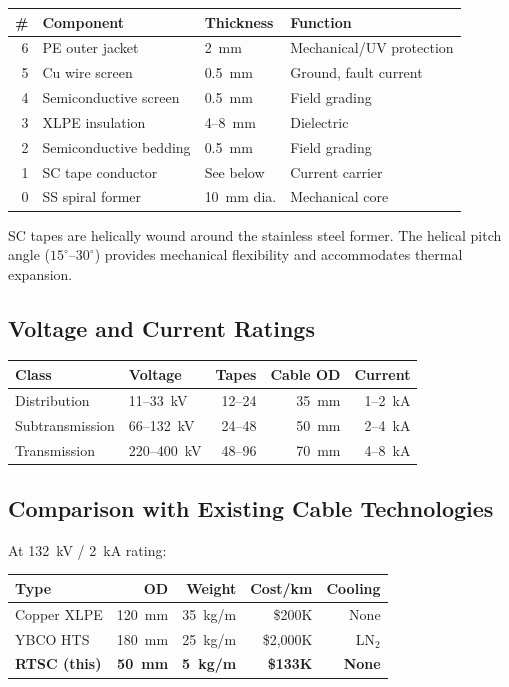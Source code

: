 \documentclass[11pt, a4paper]{article}
\begin{document}
\begin{center}
\begin{tabular}{@{}rp{4cm}ll@{}}
\toprule
\textbf{\#} & \textbf{Component} & \textbf{Thickness} &
  \textbf{Function} \\
\midrule
6 & PE outer jacket & 2~mm & Mechanical/UV protection \\
5 & Cu wire screen & 0.5~mm & Ground, fault current \\
4 & Semiconductive screen & 0.5~mm & Field grading \\
3 & XLPE insulation & 4--8~mm & Dielectric \\
2 & Semiconductive bedding & 0.5~mm & Field grading \\
1 & SC tape conductor & See below & Current carrier \\
0 & SS spiral former & 10~mm dia. & Mechanical core \\
\bottomrule
\end{tabular}
\end{center}

SC tapes are helically wound around the stainless steel former.
The helical pitch angle ($15^\circ$--$30^\circ$) provides
mechanical flexibility and accommodates thermal expansion.

\subsection{Voltage and Current Ratings}

\begin{center}
\begin{tabular}{@{}llrrr@{}}
\toprule
\textbf{Class} & \textbf{Voltage} & \textbf{Tapes} &
  \textbf{Cable OD} & \textbf{Current} \\
\midrule
Distribution & 11--33~kV & 12--24 & 35~mm & 1--2~kA \\
Subtransmission & 66--132~kV & 24--48 & 50~mm & 2--4~kA \\
Transmission & 220--400~kV & 48--96 & 70~mm & 4--8~kA \\
\bottomrule
\end{tabular}
\end{center}

\subsection{Comparison with Existing Cable Technologies}

At 132~kV / 2~kA rating:

\begin{center}
\begin{tabular}{@{}lrrrr@{}}
\toprule
\textbf{Type} & \textbf{OD} & \textbf{Weight} & \textbf{Cost/km} &
  \textbf{Cooling} \\
\midrule
Copper XLPE & 120~mm & 35~kg/m & \$200K & None \\
YBCO HTS & 180~mm & 25~kg/m & \$2{,}000K & LN$_2$ \\
\textbf{RTSC (this)} & \textbf{50~mm} & \textbf{5~kg/m} &
  \textbf{\$133K} & \textbf{None} \\
\bottomrule
\end{tabular}
\end{center}
\end{document}
